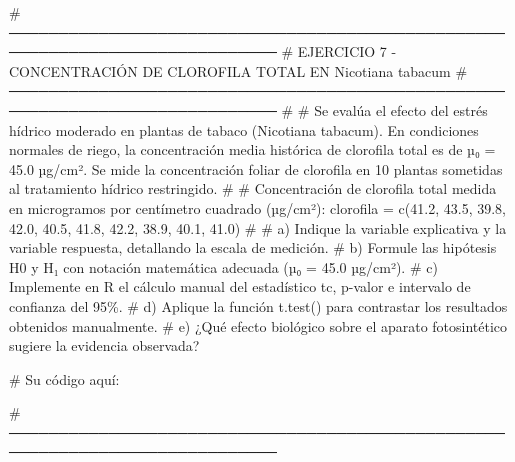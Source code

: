 \documentclass[
  spanish,
  letterpaper,
  DIV=11,
  numbers=noendperiod]{scrreprt}
\newenvironment{Shaded}{\begin{snugshade}}{\end{snugshade}}
\newcommand{\CommentTok}[1]{\textcolor[rgb]{0.37,0.37,0.37}{#1}}
\newcommand{\FloatTok}[1]{\textcolor[rgb]{0.68,0.00,0.00}{#1}}
\newcommand{\FunctionTok}[1]{\textcolor[rgb]{0.28,0.35,0.67}{#1}}
\newcommand{\NormalTok}[1]{\textcolor[rgb]{0.00,0.23,0.31}{#1}}
\newcommand{\OtherTok}[1]{\textcolor[rgb]{0.00,0.23,0.31}{#1}}
\begin{document}
\begin{Shaded}
\begin{Highlighting}[]
\CommentTok{\# ─────────────────────────────────────────────────────────────────────────────}
\CommentTok{\# EJERCICIO 7 {-} CONCENTRACIÓN DE CLOROFILA TOTAL EN Nicotiana tabacum}
\CommentTok{\# ─────────────────────────────────────────────────────────────────────────────}
\CommentTok{\#}
\CommentTok{\# Se evalúa el efecto del estrés hídrico moderado en plantas de tabaco (Nicotiana tabacum). En condiciones normales de riego, la concentración media histórica de clorofila total es de µ₀ = 45.0 µg/cm². Se mide la concentración foliar de clorofila en 10 plantas sometidas al tratamiento hídrico restringido.}
\CommentTok{\#}
\CommentTok{\# Concentración de clorofila total medida en microgramos por centímetro cuadrado (µg/cm²):}
\NormalTok{clorofila }\OtherTok{=} \FunctionTok{c}\NormalTok{(}\FloatTok{41.2}\NormalTok{, }\FloatTok{43.5}\NormalTok{, }\FloatTok{39.8}\NormalTok{, }\FloatTok{42.0}\NormalTok{, }\FloatTok{40.5}\NormalTok{, }\FloatTok{41.8}\NormalTok{, }\FloatTok{42.2}\NormalTok{, }\FloatTok{38.9}\NormalTok{, }\FloatTok{40.1}\NormalTok{, }\FloatTok{41.0}\NormalTok{)}
\CommentTok{\#}
\CommentTok{\# a) Indique la variable explicativa y la variable respuesta, detallando la escala de medición.}
\CommentTok{\# b) Formule las hipótesis H0 y H₁ con notación matemática adecuada (µ₀ = 45.0 µg/cm²).}
\CommentTok{\# c) Implemente en R el cálculo manual del estadístico tc, p{-}valor e intervalo de confianza del 95\%.}
\CommentTok{\# d) Aplique la función t.test() para contrastar los resultados obtenidos manualmente.}
\CommentTok{\# e) ¿Qué efecto biológico sobre el aparato fotosintético sugiere la evidencia observada?}

\CommentTok{\# Su código aquí:}

\CommentTok{\# ─────────────────────────────────────────────────────────────────────────────}



\end{Highlighting}
\end{Shaded}
\end{document}
